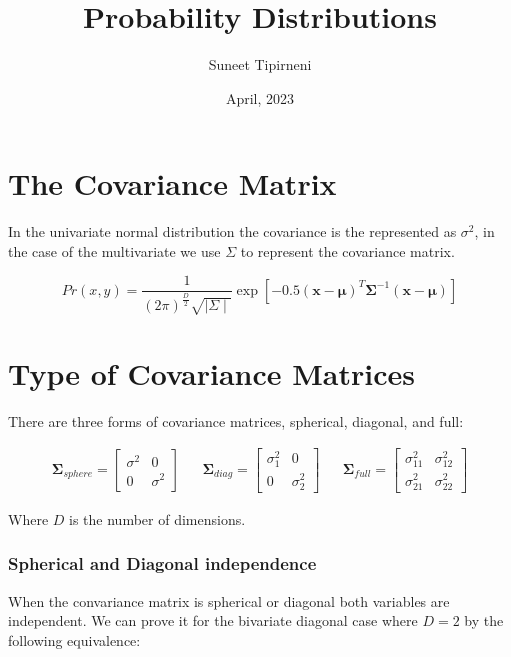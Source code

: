 \documentclass{article}
\title{Probability Distributions}
\date{April, 2023}
\author{Suneet Tipirneni}
\begin{document}
\maketitle

\section{The Covariance Matrix}

In the univariate normal distribution the covariance is the represented as $\sigma^2$, in the case of the multivariate we use $\Sigma$ to represent the covariance matrix.  \par

\begin{equation}\label{eq:norm}
	Pr\left( x,y \right) = \frac{1}{\left( 2\pi \right)^{\frac{D}{2}}\sqrt{ \mid \Sigma \mid}}\exp\left[ -0.5\left( \pmb{x} - \pmb{\mu} \right)^{T} \pmb{\Sigma}^{-1} \left( \pmb{x} - \pmb{\mu} \right)  \right] 
\end{equation}

\section{Type of Covariance Matrices}

There are three forms of covariance matrices, spherical, diagonal, and full:

\begin{align}
	\pmb{\Sigma}_{sphere} = \begin{bmatrix} \sigma^2 & 0 \\ 0 & \sigma^2  \end{bmatrix} &&
	\pmb{\Sigma}_{diag} = \begin{bmatrix} \sigma_1^2 & 0 \\ 0 & \sigma_2^2 \end{bmatrix} && 
	\pmb{\Sigma}_{full} = \begin{bmatrix} \sigma_{11}^2 & \sigma_{12}^2 \\ \sigma_{21}^2 & \sigma_{22}^2 \end{bmatrix} 
\end{align}

Where $D$ is the number of dimensions.

\subsubsection{Spherical and Diagonal independence}

When the convariance matrix is spherical or diagonal both variables are independent. We can prove it for the bivariate diagonal case where $D=2$ by the following equivalence:
\end{document}

